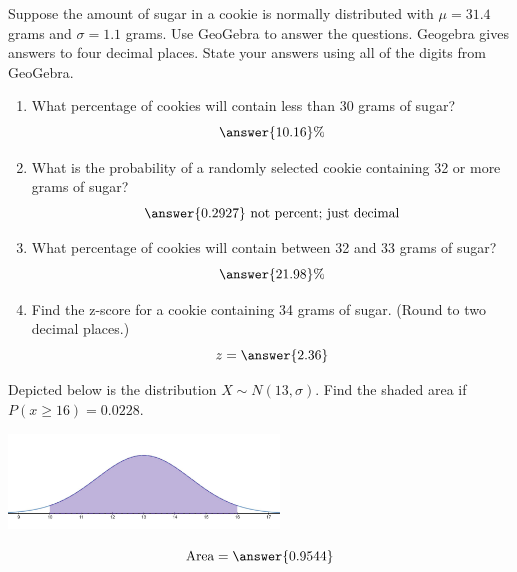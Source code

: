 \documentclass{ximera}
\begin{document}
\begin{problem}\label{prob:140hom5prob2}
Suppose the amount of sugar in a cookie is normally distributed with $\mu=31.4$ grams and $\sigma=1.1$ grams.  Use GeoGebra to answer the questions.  Geogebra gives answers to four decimal places.  State your answers using all of the digits from GeoGebra.
\begin{center}  
\end{center}
\begin{enumerate}
    \item What percentage of cookies will contain less than 30 grams of sugar?
    $$\answer{10.16}\%$$
    \item What is the probability of a randomly selected cookie containing 32 or more grams of sugar?
    $$\answer{0.2927}\mbox{ not percent; just decimal}$$
    \item What percentage of cookies will contain between 32 and 33 grams of sugar?
    $$\answer{21.98}\%$$
    \item Find the z-score for a cookie containing 34 grams of sugar.  (Round to two decimal places.)
    $$z=\answer{2.36}$$
\end{enumerate}
\end{problem}

\begin{problem}\label{prob:140hom5prob5}
Depicted below is the distribution $X\sim N(13, \sigma)$.  Find the shaded area if $P(x\geq 16)=0.0228$.
\begin{image}
   \includegraphics[height=1in]{140H5pic4.jpg}
 \end{image}
 $$\mbox{Area}=\answer{0.9544}$$
\end{problem}
\end{document}
